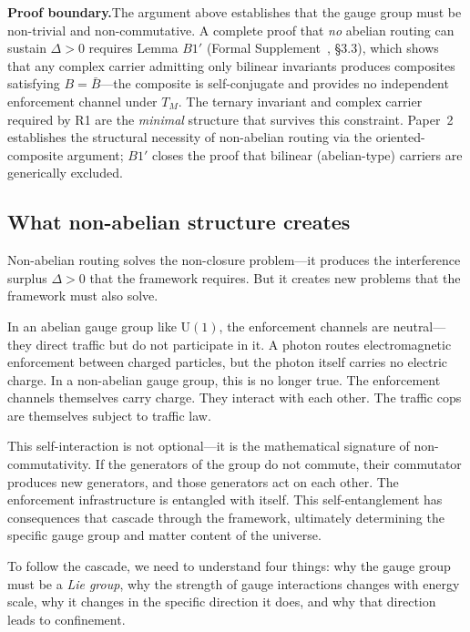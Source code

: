 \documentclass[11pt]{article}
\newcommand{\U}{\mathrm{U}}
\begin{document}
\smallskip
\noindent\textbf{Proof boundary.}\quad The argument above establishes that the gauge group must be non-trivial and non-commutative.  A complete proof that \emph{no} abelian routing can sustain $\Delta > 0$ requires Lemma $B1'$ (Formal Supplement~\cite{BrookeP2Supplement}, \S3.3), which shows that any complex carrier admitting only bilinear invariants produces composites satisfying $B = \bar{B}$---the composite is self-conjugate and provides no independent enforcement channel under $T_M$.  The ternary invariant and complex carrier required by R1 are the \emph{minimal} structure that survives this constraint.  Paper~2 establishes the structural necessity of non-abelian routing via the oriented-composite argument; $B1'$ closes the proof that bilinear (abelian-type) carriers are generically excluded.


\subsection{What non-abelian structure creates}

Non-abelian routing solves the non-closure problem---it produces the interference surplus $\Delta > 0$ that the framework requires.  But it creates new problems that the framework must also solve.

In an abelian gauge group like $\U(1)$, the enforcement channels are neutral---they direct traffic but do not participate in it.  A photon routes electromagnetic enforcement between charged particles, but the photon itself carries no electric charge.  In a non-abelian gauge group, this is no longer true.  The enforcement channels themselves carry charge.  They interact with each other.  The traffic cops are themselves subject to traffic law.

This self-interaction is not optional---it is the mathematical signature of non-commutativity.  If the generators of the group do not commute, their commutator produces new generators, and those generators act on each other.  The enforcement infrastructure is entangled with itself.  This self-entanglement has consequences that cascade through the framework, ultimately determining the specific gauge group and matter content of the universe.

To follow the cascade, we need to understand four things: why the gauge group must be a \emph{Lie group}, why the strength of gauge interactions changes with energy scale, why it changes in the specific direction it does, and why that direction leads to confinement.
\end{document}
